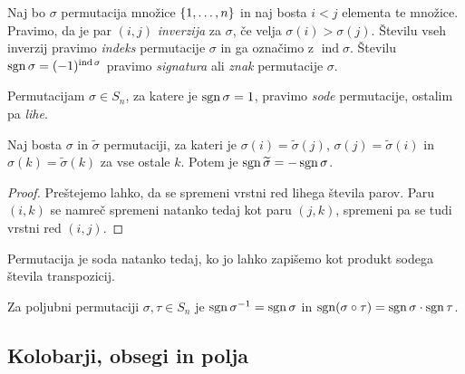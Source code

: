 \documentclass[12pt, a4paper]{article}
\begin{document}
\begin{definicija}
Naj bo $\sigma$ permutacija množice $\left\{1,\dots,n\right\}$ in naj bosta $i<j$ elementa te množice. Pravimo, da je par $(i,j)$ \emph{inverzija} za $\sigma$, če velja $\sigma(i)>\sigma(j)$.  Številu vseh inverzij pravimo \emph{indeks} permutacije $\sigma$ in ga označimo z $\operatorname{ind}\sigma$. Številu $\operatorname{sgn}\sigma=(-1)^{\operatorname{ind}\sigma}$ pravimo \emph{signatura} ali \emph{znak} permutacije $\sigma$.
\end{definicija}

\begin{definicija}
Permutacijam $\sigma\in S_n$, za katere je $\operatorname{sgn}\sigma=1$, pravimo \emph{sode} permutacije, ostalim pa \emph{lihe}.
\end{definicija}

\begin{trditev}
Naj bosta $\sigma$ in $\widetilde{\sigma}$ permutaciji, za kateri je $\sigma(i)=\widetilde{\sigma}(j)$, $\sigma(j)=\widetilde{\sigma}(i)$ in $\sigma(k)=\widetilde{\sigma}(k)$ za vse ostale $k$. Potem je $\operatorname{sgn}\widetilde{\sigma}=-\operatorname{sgn}\sigma$.
\end{trditev}

\begin{proof}
Preštejemo lahko, da se spremeni vrstni red lihega števila parov. Paru $(i,k)$ se namreč spremeni natanko tedaj kot paru $(j,k)$, spremeni pa se tudi vrstni red $(i,j)$.
\end{proof}

\begin{posledica}
Permutacija je soda natanko tedaj, ko jo lahko zapišemo kot produkt sodega števila transpozicij.
\end{posledica}

\begin{posledica}
Za poljubni permutaciji $\sigma,\tau\in S_n$ je $\operatorname{sgn}\sigma^{-1}=\operatorname{sgn}\sigma$ in $\operatorname{sgn}(\sigma\circ\tau)=\operatorname{sgn}\sigma\cdot\operatorname{sgn}\tau$.
\end{posledica}

\newpage

\subsection{Kolobarji, obsegi in polja}
\end{document}
